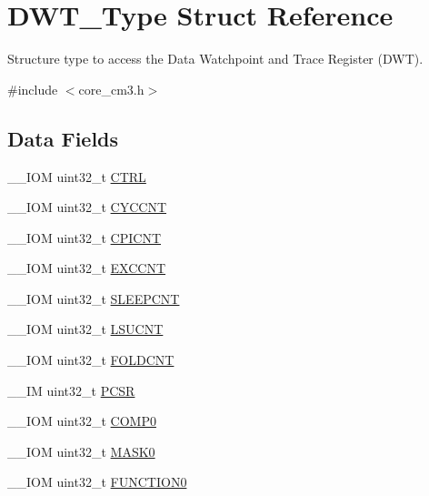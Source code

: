 \hypertarget{struct_d_w_t___type}{}\section{D\+W\+T\+\_\+\+Type Struct Reference}
\label{struct_d_w_t___type}


Structure type to access the Data Watchpoint and Trace Register (D\+WT).  




{\ttfamily \#include $<$core\+\_\+cm3.\+h$>$}

\subsection*{Data Fields}
\begin{DoxyCompactItemize}
\item 
\+\_\+\+\_\+\+I\+OM uint32\+\_\+t \hyperlink{struct_d_w_t___type_ac81efc171e9852a36caeb47122bfec5b}{C\+T\+RL}
\item 
\+\_\+\+\_\+\+I\+OM uint32\+\_\+t \hyperlink{struct_d_w_t___type_a14822f5ad3426799332ac537d9293f3c}{C\+Y\+C\+C\+NT}
\item 
\+\_\+\+\_\+\+I\+OM uint32\+\_\+t \hyperlink{struct_d_w_t___type_a29ca657c77928334be08a2e6555be950}{C\+P\+I\+C\+NT}
\item 
\+\_\+\+\_\+\+I\+OM uint32\+\_\+t \hyperlink{struct_d_w_t___type_afe0bbc124e53ad450abc72bfb56bd74f}{E\+X\+C\+C\+NT}
\item 
\+\_\+\+\_\+\+I\+OM uint32\+\_\+t \hyperlink{struct_d_w_t___type_aafa1400cd3168b21652b86599ad3ed83}{S\+L\+E\+E\+P\+C\+NT}
\item 
\+\_\+\+\_\+\+I\+OM uint32\+\_\+t \hyperlink{struct_d_w_t___type_ae886261750c8c90d67a2f276d074e9c3}{L\+S\+U\+C\+NT}
\item 
\+\_\+\+\_\+\+I\+OM uint32\+\_\+t \hyperlink{struct_d_w_t___type_a6324c1fbf6c94f1eaf742d09ad678216}{F\+O\+L\+D\+C\+NT}
\item 
\+\_\+\+\_\+\+IM uint32\+\_\+t \hyperlink{struct_d_w_t___type_a72e52fffe9ac6af0ee15877e2d5dac41}{P\+C\+SR}
\item 
\+\_\+\+\_\+\+I\+OM uint32\+\_\+t \hyperlink{struct_d_w_t___type_a5d0c69187f8abc99ecbde49431cf0050}{C\+O\+M\+P0}
\item 
\+\_\+\+\_\+\+I\+OM uint32\+\_\+t \hyperlink{struct_d_w_t___type_a84089e08ecf14b86f92c727a568ceac4}{M\+A\+S\+K0}
\item 
\+\_\+\+\_\+\+I\+OM uint32\+\_\+t \hyperlink{struct_d_w_t___type_ad3c69d206a52a85165eb7bd8077b0608}{F\+U\+N\+C\+T\+I\+O\+N0}

\end{DoxyCompactItemize}
